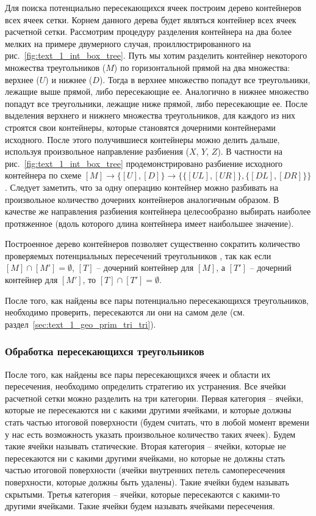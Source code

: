Для поиска потенциально пересекающихся ячеек построим дерево контейнеров всех ячеек сетки.
Корнем данного дерева будет являться контейнер всех ячеек расчетной сетки.
Рассмотрим процедуру разделения контейнера на два более мелких на примере двумерного случая, проиллюстрированного на рис.~\ref{fig:text_1_int_box_tree}.
Путь мы хотим разделить контейнер некоторого множества треугольников ($M$) по горизонтальной прямой на два множества: верхнее ($U$) и нижнее ($D$).
Тогда в верхнее множество попадут все треугольники, лежащие выше прямой, либо пересекающие ее.
Аналогично в нижнее множество попадут все треугольники, лежащие ниже прямой, либо пересекающие ее.
После выделения верхнего и нижнего множества треугольников, для каждого из них строятся свои контейнеры, которые становятся дочерними контейнерами исходного.
После этого получившиеся контейнеры можно делить дальше, используя произвольное направление разбиения ($X$, $Y$, $Z$).
В частности на рис.~\ref{fig:text_1_int_box_tree} продемонстрировано разбиение исходного контейнера по схеме $[M] \rightarrow \{[U], [D]\} \rightarrow \{\{[UL], [UR]\}, \{[DL], [DR]\}\}$.
Следует заметить, что за одну операцию контейнер можно разбивать на произвольное количество дочерних контейнеров аналогичным образом.
В качестве же направления разбиения контейнера целесообразно выбирать наиболее протяженное (вдоль которого длина контейнера имеет наибольшее значение).

Построенное дерево контейнеров позволяет существенно сократить количество проверяемых потенциальных пересечений треугольников \cite{Jung2004Int}, так как если $[M] \cap [M'] = \emptyset$, $[T]$ -- дочерний контейнер для $[M]$, а $[T']$ -- дочерний контейнер для $[M']$, то $[T] \cap [T'] = \emptyset$.

После того, как найдены все пары потенциально пересекающихся треугольников, необходимо проверить, пересекаются ли они на самом деле (см. раздел~\ref{sec:text_1_geo_prim_tri_tri}).

\subsubsection{Обработка пересекающихся треугольников}

После того, как найдены все пары пересекающихся ячеек и области их пересечения, необходимо определить стратегию их устранения.
Все ячейки расчетной сетки можно разделить на три категории.
Первая категория -- ячейки, которые не пересекаются ни с какими другими ячейками, и которые должны стать частью итоговой поверхности (будем считать, что в любой момент времени у нас есть возможность указать произвольное количество таких ячеек).
Будем такие ячейки называть статические.
Вторая категория -- ячейки, которые не пересекаются ни с какими другими ячейками, но которые не должны стать частью итоговой поверхности (ячейки внутренних петель самопересечения поверхности, которые должны быть удалены).
Такие ячейки будем называть скрытыми.
Третья категория -- ячейки, которые пересекаются с какими-то другими ячейками. 
Такие ячейки будем называть ячейками пересечения.

